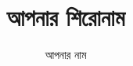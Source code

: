 \documentclass[12pt, a4paper]{book}
\title{আপনার শিরোনাম}
\author{আপনার নাম}
\begin{document}
\frontmatter

\maketitle

\tableofcontents

\mainmatter



\backmatter

\begin{otherlanguage}{bengali}

\end{otherlanguage}
\end{document}
